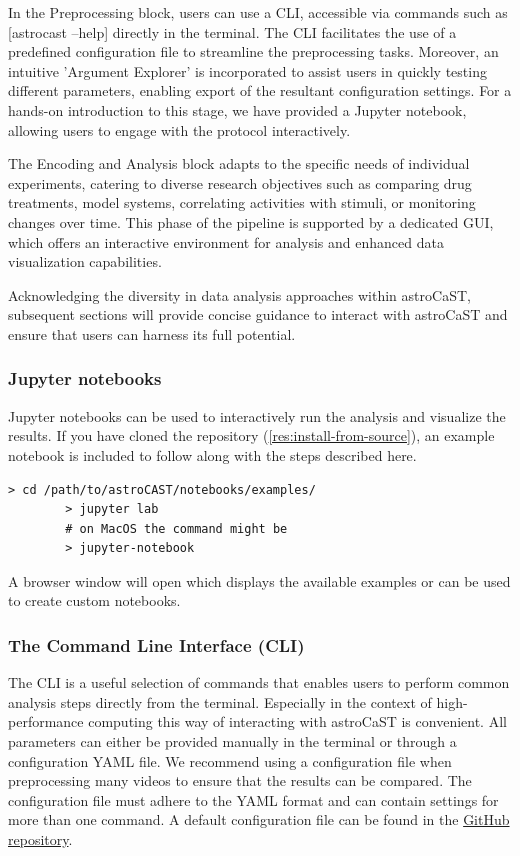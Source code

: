 \documentclass[utf8]{FrontiersinHarvard}
\newcommand{\inlineBash}[1]{%
    \begingroup
    \edef\temp{#1}%
    \expandafter\StrSubstitute\expandafter{\temp}{--}{-{-}}[\temp]%
    \tcbox[on line, boxsep=0pt, left=1pt, right=1pt, top=1pt, bottom=1pt,
        boxrule=0pt, arc=0pt, outer arc=0pt, colback=lightgray]{
        \texttt{\small \temp}
    }%
    \endgroup
}
\begin{document}
    In the Preprocessing block, users can use a \ac{CLI}, accessible via commands such as \inlineBash{astrocast --help} directly in the terminal. The \ac{CLI} facilitates the use of a predefined configuration file to streamline the preprocessing tasks. Moreover, an intuitive 'Argument Explorer' is incorporated to assist users in quickly testing different parameters, enabling export of the resultant configuration settings. For a hands-on introduction to this stage, we have provided a Jupyter notebook, allowing users to engage with the protocol interactively.

    The Encoding and Analysis block adapts to the specific needs of individual experiments, catering to diverse research objectives such as comparing drug treatments, model systems, correlating activities with stimuli, or monitoring changes over time. This phase of the pipeline is supported by a dedicated \ac{GUI}, which offers an interactive environment for analysis and enhanced data visualization capabilities.

    Acknowledging the diversity in data analysis approaches within \ac{astroCaST}, subsequent sections will provide concise guidance to interact with astroCaST and ensure that users can harness its full potential.

    \subsubsection{Jupyter notebooks}

    Jupyter notebooks can be used to interactively run the analysis and visualize the results.
    If you have cloned the repository (\ref{res:install-from-source}), an example notebook is included to follow along with the steps described here.

    \begin{lstlisting}[style=bashStyle]
        > cd /path/to/astroCAST/notebooks/examples/
        > jupyter lab
        # on MacOS the command might be
        > jupyter-notebook
    \end{lstlisting}

    A browser window will open which displays the available examples or can be used to create custom notebooks.

    \subsubsection{The Command Line Interface (CLI)}

    The \ac{CLI} is a useful selection of commands that enables users to perform common analysis steps directly from the terminal. Especially in the context of high-performance computing this way of interacting with astroCaST is convenient. All parameters can either be provided manually in the terminal or through a configuration YAML file. We recommend using a configuration file when preprocessing many videos to ensure that the results can be compared. The configuration file must adhere to the YAML format and can contain settings for more than one command. A default configuration file can be found in the \href{https://github.com/janreising/astroCAST/blob/3ad41d03068732419df7fdde9b2a0f449898d4e2/config.yaml}{GitHub repository}.
\end{document}

